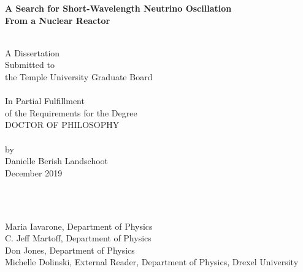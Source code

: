 \begin{titlepage}
	
	\begin{centering} 
		{\bf {\Large A Search for Short-Wavelength Neutrino Oscillation\\ From a Nuclear Reactor}}
		
		\vspace{1cm}
		\noindent\makebox[\linewidth]{\rule{16cm}{0.4pt}} \\ 
		\vspace{1cm}
		A Dissertation                       \\
		Submitted to                         \\
		the Temple University Graduate Board \\
		\vspace{1cm}
		\noindent\makebox[\linewidth]{\rule{16cm}{0.4pt}} \\ 
		\vspace{1cm} 
		In Partial Fulfillment               \\
		of the Requirements for the Degree   \\
		DOCTOR OF PHILOSOPHY                 \\
		\vspace{1cm} 
		\noindent\makebox[\linewidth]{\rule{16cm}{0.4pt}} \\ 
		\vspace{1cm} 
		by                                   \\
		Danielle Berish Landschoot                      \\
		December 2019                            \\
	\end{centering}                      
	
	\vspace{1cm}
	\\
	\vspace{0.20cm}
	
	        \\
	{Maria Iavarone, Department of Physics}                                        \\
	{C. Jeff Martoff, Department of Physics}                                       \\
	{Don Jones, Department of Physics}                                       \\
	{Michelle  Dolinski, External Reader, Department of Physics, Drexel University}
	
\end{titlepage}
